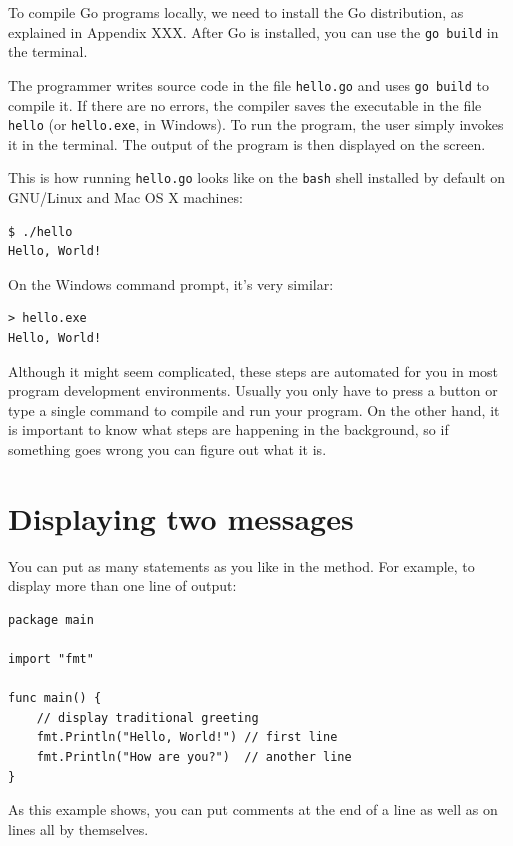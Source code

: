 To compile Go programs locally, we need to install the Go distribution, as explained in Appendix XXX. After Go is installed, you can use the {\tt go build} in the terminal.


The programmer writes source code in the file {\tt hello.go} and uses {\tt go build} to compile it.
If there are no errors, the compiler saves the executable in the file {\tt hello} (or {\tt hello.exe}, in Windows).
To run the program, the user simply invokes it in the terminal.
The output of the program is then displayed on the screen.

This is how running {\tt hello.go} looks like on the {\tt bash} shell installed by default on GNU/Linux and Mac OS X machines:

\begin{verbatim}
$ ./hello 
Hello, World!
\end{verbatim}

On the Windows command prompt, it's very similar:

\begin{verbatim}
> hello.exe 
Hello, World!
\end{verbatim}


Although it might seem complicated, these steps are automated for you in most program development environments.
Usually you only have to press a button or type a single command to compile and run your program.
On the other hand, it is important to know what steps are happening in the background,
so if something goes wrong you can figure out what it is.


\section{Displaying two messages}

You can put as many statements as you like in the  method.
For example, to display more than one line of output:

\begin{lstlisting}
package main

import "fmt"

func main() {
	// display traditional greeting
	fmt.Println("Hello, World!") // first line
	fmt.Println("How are you?")  // another line
}
\end{lstlisting}

As this example shows, you can put comments at the end of a line as well as on lines all by themselves.

